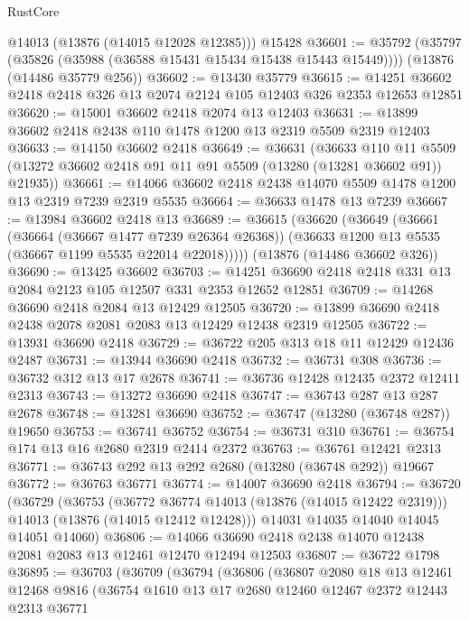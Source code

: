 \begin{lexlean}{RustCore}
\begin{coremodule}
      @14013
      (@13876 (@14015 @12028 @12385)))
    @15428
@36601 := @35792
    (@35797 (@35826 (@35988 (@36588 @15431 @15434 @15438 @15443 @15449))))
    (@13876 (@14486 @35779 @256))
@36602 := @13430 @35779
@36615 := @14251 @36602 @2418 @2418 @326 @13 @2074 @2124 @105 @12403 @326 @2353 @12653 @12851
@36620 := @15001 @36602 @2418 @2074 @13 @12403
@36631 := @13899 @36602 @2418 @2438 @110 @1478 @1200 @13 @2319 @5509 @2319 @12403
@36633 := @14150 @36602 @2418
@36649 := @36631
    (@36633
      @110
      @11
      @5509
      (@13272 @36602 @2418 @91 @11 @91 @5509 (@13280 (@13281 @36602 @91)) @21935))
@36661 := @14066 @36602 @2418 @2438 @14070 @5509 @1478 @1200 @13 @2319 @7239 @2319 @5535
@36664 := @36633 @1478 @13 @7239
@36667 := @13984 @36602 @2418 @13
@36689 := @36615
    (@36620
      (@36649
        (@36661
          (@36664 (@36667 @1477 @7239 @26364 @26368))
          (@36633 @1200 @13 @5535 (@36667 @1199 @5535 @22014 @22018)))))
    (@13876 (@14486 @36602 @326))
@36690 := @13425 @36602
@36703 := @14251 @36690 @2418 @2418 @331 @13 @2084 @2123 @105 @12507 @331 @2353 @12652 @12851
@36709 := @14268 @36690 @2418 @2084 @13 @12429 @12505
@36720 := @13899 @36690 @2418 @2438 @2078 @2081 @2083 @13 @12429 @12438 @2319 @12505
@36722 := @13931 @36690 @2418
@36729 := @36722 @205 @313 @18 @11 @12429 @12436 @2487
@36731 := @13944 @36690 @2418
@36732 := @36731 @308
@36736 := @36732 @312 @13 @17 @2678
@36741 := @36736 @12428 @12435 @2372 @12411 @2313
@36743 := @13272 @36690 @2418
@36747 := @36743 @287 @13 @287 @2678
@36748 := @13281 @36690
@36752 := @36747 (@13280 (@36748 @287)) @19650
@36753 := @36741 @36752
@36754 := @36731 @310
@36761 := @36754 @174 @13 @16 @2680 @2319 @2414 @2372
@36763 := @36761 @12421 @2313
@36771 := @36743 @292 @13 @292 @2680 (@13280 (@36748 @292)) @19667
@36772 := @36763 @36771
@36774 := @14007 @36690 @2418
@36794 := @36720
    (@36729
      (@36753
        (@36772 @36774 @14013 (@13876 (@14015 @12422 @2319)))
        @14013
        (@13876 (@14015 @12412 @12428)))
      @14031
      @14035
      @14040
      @14045
      @14051
      @14060)
@36806 := @14066 @36690 @2418 @2438 @14070 @12438 @2081 @2083 @13 @12461 @12470 @12494 @12503
@36807 := @36722 @1798
@36895 := @36703
    (@36709
      (@36794
        (@36806
          (@36807
            @2080
            @18
            @13
            @12461
            @12468
            @9816
            (@36754
              @1610
              @13
              @17
              @2680
              @12460
              @12467
              @2372
              @12443
              @2313
              @36771

\end{coremodule}
\end{lexlean}
